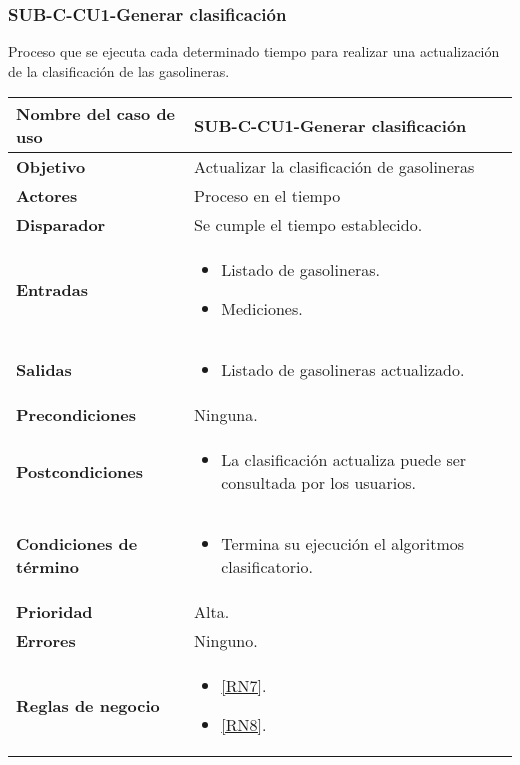 \subsubsection{SUB-C-CU1-Generar clasificación}\label{SUB-C-CU1}
Proceso que se ejecuta cada determinado tiempo para realizar una actualización de la clasificación de las gasolineras.

\begin{longtable}{|J{5cm}|J{10.3cm}|}
	\hline
	\textbf{Nombre del caso de uso} &
		SUB-C-CU1-Generar clasificación \\ \hline
	\textbf{Objetivo} &
		Actualizar la clasificación de gasolineras \\ \hline
	\textbf{Actores} &
		Proceso en el tiempo \\ \hline 
	\textbf{Disparador} & 
		Se cumple el tiempo establecido. \\ \hline 
	\textbf{Entradas} & 
		\begin{itemize}
				\item Listado de gasolineras.
				\item Mediciones.
		\end{itemize}\\ \hline 
	\textbf{Salidas} & 
		\begin{itemize}
			\item Listado de gasolineras actualizado.
		\end{itemize} \\ \hline
	\textbf{Precondiciones} &
		Ninguna.\\ \hline
	\textbf{Postcondiciones} &
		\begin{itemize}
			\item La clasificación actualiza puede ser consultada por los usuarios.
		\end{itemize} \\ \hline
	\textbf{Condiciones de término} & 
		\begin{itemize}
			\item Termina su ejecución el algoritmos clasificatorio.
		\end{itemize} \\ \hline 
	\textbf{Prioridad} & 
		Alta. \\ \hline
	\textbf{Errores} & Ninguno.
		\\ \hline
	\textbf{Reglas de negocio} & 
		\begin{itemize}
			\item \ref{RN7}.
			\item \ref{RN8}.
		\end{itemize}
		 \\ \hline
\end{longtable}


